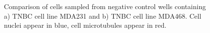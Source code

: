 \begin{figure}%
    \centering
    \qquad
	\caption{Comparison of cells sampled from negative control wells containing a) TNBC cell line MDA231 and b) TNBC cell line MDA468. Cell nuclei appear in blue, cell microtubules appear in red.}
    \label{fig:cell_line_morphologies}%
\end{figure}

